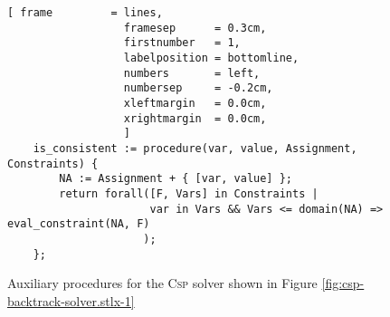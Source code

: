 \begin{figure}[!ht]
\centering
\begin{Verbatim}[ frame         = lines, 
                  framesep      = 0.3cm, 
                  firstnumber   = 1,
                  labelposition = bottomline,
                  numbers       = left,
                  numbersep     = -0.2cm,
                  xleftmargin   = 0.0cm,
                  xrightmargin  = 0.0cm,
                  ]
    is_consistent := procedure(var, value, Assignment, Constraints) {
        NA := Assignment + { [var, value] };
        return forall([F, Vars] in Constraints |
                      var in Vars && Vars <= domain(NA) => eval_constraint(NA, F)
                     );
    };
\end{Verbatim}
\vspace*{-0.3cm}
\caption{Auxiliary procedures for the \textsc{Csp} solver shown in Figure \ref{fig:csp-backtrack-solver.stlx-1}}
\label{fig:csp-backtrack-solver.stlx-2}
\end{figure}

